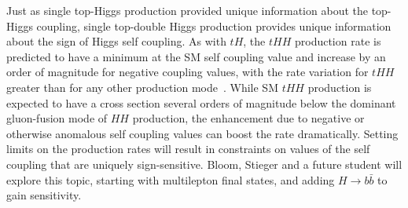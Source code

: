 
Just as single top-Higgs production provided unique information about the top-Higgs coupling, single top-double Higgs production provides unique information about the sign of Higgs self coupling.  As with $tH$, the $tHH$ production rate is predicted to have a minimum at the SM self coupling value and increase by an order of magnitude for negative coupling values, with the rate variation for $tHH$ greater than for any other production mode~\cite{bib:HHproduction_theory}. While SM $tHH$ production is expected to have a cross section several orders of magnitude below the dominant gluon-fusion mode of $HH$ production, the enhancement due to negative or otherwise anomalous self coupling values can boost the rate dramatically. Setting limits on the production rates will result in constraints on values of the self coupling that are uniquely sign-sensitive. Bloom, Stieger and a future student will explore this topic, starting with multilepton final states, and adding $H \to b{\bar b}$ to gain sensitivity.



